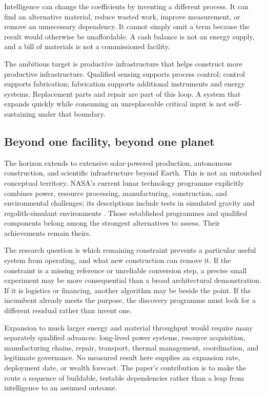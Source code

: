 Intelligence can change the coefficients by inventing a different process. It can find an alternative material, reduce wasted work, improve measurement, or remove an unnecessary dependency. It cannot simply omit a term because the result would otherwise be unaffordable. A cash balance is not an energy supply, and a bill of materials is not a commissioned facility.

The ambitious target is productive infrastructure that helps construct more productive infrastructure. Qualified sensing supports process control; control supports fabrication; fabrication supports additional instruments and energy systems. Replacement parts and repair are part of this loop. A system that expands quickly while consuming an unreplaceable critical input is not self-sustaining under that boundary.

\subsection{Beyond one facility, beyond one planet}

The horizon extends to extensive solar-powered production, autonomous construction, and scientific infrastructure beyond Earth. This is not an untouched conceptual territory. NASA's current lunar technology programme explicitly combines power, resource processing, manufacturing, construction, and environmental challenges; its descriptions include tests in simulated gravity and regolith-simulant environments \citep{nasa2026}. Those established programmes and qualified components belong among the strongest alternatives to assess. Their achievements remain theirs.

The research question is which remaining constraint prevents a particular useful system from operating, and what new construction can remove it. If the constraint is a missing reference or unreliable conversion step, a precise small experiment may be more consequential than a broad architectural demonstration. If it is logistics or financing, another algorithm may be beside the point. If the incumbent already meets the purpose, the discovery programme must look for a different residual rather than invent one.

Expansion to much larger energy and material throughput would require many separately qualified advances: long-lived power systems, resource acquisition, manufacturing chains, repair, transport, thermal management, coordination, and legitimate governance. No measured result here supplies an expansion rate, deployment date, or wealth forecast. The paper's contribution is to make the route a sequence of buildable, testable dependencies rather than a leap from intelligence to an assumed outcome.

